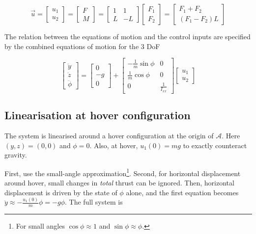 \documentclass[a4paper]{report}
\begin{document}
\begin{equation} \label{eq:control_vec_nonlin}
 \vec{u} = 
\begin{bmatrix}
u_1 \\
u_2
\end{bmatrix} 
= 
\begin{bmatrix}
F \\
M
\end{bmatrix} 
= 
\begin{bmatrix}
1 & 1 \\
L & -L
\end{bmatrix} 
\begin{bmatrix}
F_1 \\
F_2
\end{bmatrix} 
=
\begin{bmatrix}
F_1 + F_2 \\
(F_1 - F_2)L
\end{bmatrix} 
\end{equation}


The relation between the equations of motion and the control inputs are specified by the combined equations of motion for the 3 \gls{DoF} 

$$
\begin{bmatrix}
\ddot{y} \\
\ddot{z}\\
\ddot{\phi}
\end{bmatrix}
= 
\begin{bmatrix}
0 \\
-g\\
0
\end{bmatrix}
+
\begin{bmatrix}
-\frac{1}{m} \sin\phi & 0 \\
\frac{1}{m} \cos\phi & 0 \\
0 & \frac{1}{I_{xx}}
\end{bmatrix}
\begin{bmatrix}
u_1 \\
u_2
\end{bmatrix} 
$$

\subsection{Linearisation at hover configuration}

The system is linearised around a hover configuration at the origin of $\mathcal{A}$.
Here $(y,z)=(0, 0)$ and $\phi=0$. 
Also, at hover, $u_1(0) = mg$ to exactly counteract gravity.

First, use the small-angle approximation\footnote{For small angles $\cos\phi \approx 1$ and $\sin\phi \approx \phi$.}. 
Second, for horizontal displacement around hover, small changes in \textit{total} thrust can be ignored.
Then, horizontal displacement is driven by the state of $\phi$ alone, and
the first equation becomes $\ddot{y}\approx -\frac{u_1(0)}{m}\phi=-g\phi$. 
The full system is
\end{document}
